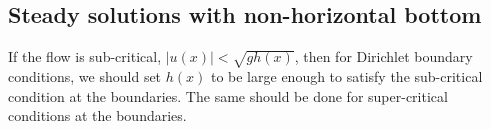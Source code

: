 \subsection{Steady solutions with non-horizontal bottom} %
\label{sub:steady_solutions_with_non_horizontal_bottom}


If the flow is sub-critical, $|u(x)|<\sqrt{gh(x)}$, then for Dirichlet boundary conditions, we should set $h(x)$ to be large enough to satisfy the sub-critical condition at the boundaries.  The same should be done for super-critical conditions at the boundaries.




